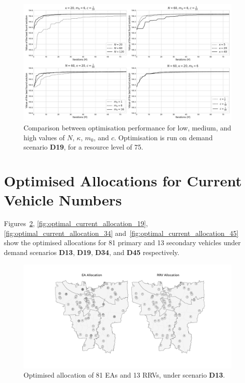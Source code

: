 \documentclass[preprint,12pt]{elsarticle}
\begin{document}
\begin{figure}[ht]
\centering
\includegraphics[width=\textwidth]{img/hyperparameter_exploration}
\caption{Comparison between optimisation performance for low, medium, and high
values of $N$, $\kappa$, $m_0$, and $c$. Optimisation is run on demand
scenario \textbf{D19}, for a resource level of 75.}
\label{fig:hyperparameters_exploration}
\end{figure}


\section{Optimised Allocations for Current Vehicle Numbers}
Figures~\ref{fig:optimal_current_allocation_13},
\ref{fig:optimal_current_allocation_19}, \ref{fig:optimal_current_allocation_34}
and~\ref{fig:optimal_current_allocation_45} show the optimised allocations for
81 primary and 13 secondary vehicles under demand scenarios \textbf{D13},
\textbf{D19}, \textbf{D34}, and \textbf{D45} respectively.

\begin{figure}
\begin{center}
\includegraphics[width=\textwidth]{img/map_optimised_13}
\caption{Optimised allocation of 81 EAs and 13 RRVs, under scenario \textbf{D13}.}
\label{fig:optimal_current_allocation_13}
\end{center}
\end{figure}
\end{document}
